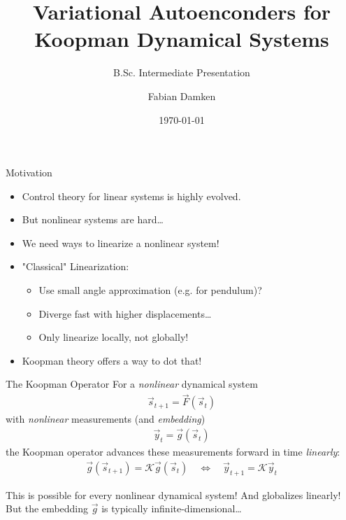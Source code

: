 \documentclass[
	aspectratio=43,
	color={accentcolor=1c},
	logo=false,
	colorframetitle=true,
]{tudabeamer}
\title{Variational Autoenconders for Koopman Dynamical Systems}
\subtitle{B.Sc. Intermediate Presentation}
\author{Fabian Damken}
\institute{Intelligent Autonomous Systems}
\date{\today}
\begin{document}
	\maketitle

	\begin{frame}{Motivation}
		\begin{itemize}
			\item Control theory for linear systems is highly evolved.
			\item But nonlinear systems are hard\dots
			\item We need ways to linearize a nonlinear system!
			\item<2-> "Classical" Linearization:
				\begin{itemize}
					\item Use small angle approximation (e.g. for pendulum)?
					\item Diverge fast with higher displacements\dots
					\item Only linearize locally, not globally!
				\end{itemize}
			\item<3-> Koopman theory offers a way to dot that!
		\end{itemize}
	\end{frame}

	\begin{frame}{The Koopman Operator}
		For a \emph{nonlinear} dynamical system
		\begin{align*}
			\vec{s}_{t + 1} = \vec{F}(\vec{s}_{t})
		\end{align*}
		with \emph{nonlinear} measurements (and \emph{embedding})
		\begin{align*}
			\vec{y}_t = \vec{g}(\vec{s}_t)
		\end{align*}
		the Koopman operator advances these measurements forward in time \emph{linearly}:
		\begin{align*}
			\vec{g}(\vec{s}_{t + 1}) = \mathcal{K} \vec{g}(\vec{s}_t)
			\quad\iff\quad
			\vec{y}_{t + 1} = \mathcal{K} \vec{y}_t
		\end{align*}

		This is possible for every nonlinear dynamical system! And globalizes linearly! But the embedding \(\vec{g}\) is typically infinite-dimensional\dots
	\end{frame}
\end{document}
